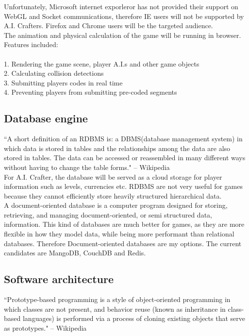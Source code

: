 \documentclass[12pt]{article}
\begin{document}
Unfortunately, Microsoft internet exporleror has not provided their support on WebGL and Socket communications, therefore IE users will not be supported by A.I. Crafters. Firefox and Chrome users will be the targeted audience.\\


The animation and physical calculation of the game will be running in browser. Features included:\\
\\
1. Rendering the game scene, player A.I.s and other game objects\\
2. Calculating collision detections\\
3. Submitting players codes in real time\\
4. Preventing players from submitting pre-coded segments\\

\subsection{Database engine}
``A short definition of an RDBMS is: a DBMS(database management system) in which data is stored in tables and the relationships among the data are also stored in tables. The data can be accessed or reassembled in many different ways without having to change the table forms." -- Wikipedia\\

For A.I. Crafter, the database will be served as a cloud storage for player information such as levels, currencies etc. RDBMS are not very useful for games because they cannot efficiently store heavily structured hierarchical data\cite{ari}.\\ 

A document-oriented database is a computer program designed for storing, retrieving, and managing document-oriented, or semi structured data, information. This kind of databases are much better for games, as they are more flexible in how they model data, while being more performant than relational databases\cite{michael10}. Therefore Document-oriented databases are my options. The current candidates are MangoDB, CouchDB and Redis.\\

\subsection{Software architecture}

``Prototype-based programming is a style of object-oriented programming in which classes are not present, and behavior reuse (known as inheritance in class-based languages) is performed via a process of cloning existing objects that serve as prototypes." -- Wikipedia\\
\end{document}
